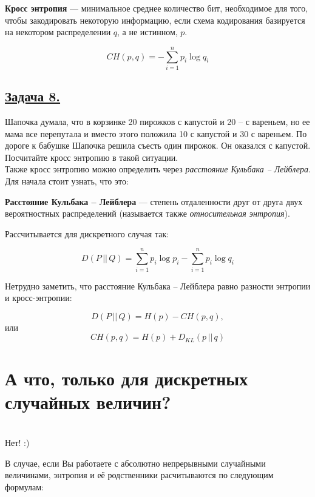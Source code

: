 \begin{siderules}
    \textbf{Кросс энтропия} --- минимальное среднее количество бит, необходимое для того, чтобы закодировать некоторую информацию, если схема кодирования базируется на некотором распределении $q$, а не истинном, $p$.
\end{siderules}

\[CH(p, q)=-\sum\limits_{i=1}^{n}p_i\log q_i \]

\subsection*{\hyperref[sec:sol_problem8]{Задача 8.}}\label{sec:problem8} Шапочка думала, что в корзинке 20 пирожков с капустой и 20 – с вареньем, но ее мама все перепутала и вместо этого положила 10 с капустой и 30 с вареньем. По дороге к бабушке Шапочка решила съесть один пирожок. Он оказался с капустой. Посчитайте кросс энтропию в такой ситуации.\\


Также кросс энтропию можно определить через \textit{расстояние Кульбака -- Лейблера}. Для начала стоит узнать, что это:

\begin{siderules}
    \textbf{Расстояние Кульбака -- Лейблера} --- степень отдаленности друг от друга двух вероятностных распределений (называется также \textit{относительная энтропия}). \end{siderules}
    
    Рассчитывается для дискретного случая так:

    \[D(P\, ||\, Q)=\sum\limits_{i=1}^n p_i\log p_i-\sum\limits_{i=1}^n p_i\log q_i\]

Нетрудно заметить, что расстояние Кульбака -- Лейблера равно разности энтропии и кросс-энтропии:

\[D(P\, ||\, Q)=H(p)-CH(p,q),\]
или
\[CH(p, q)=H(p)+D_{KL}(p\, || \, q)\]

\section*{А что, только для дискретных случайных величин?}~\
\\

Нет! :)

В случае, если Вы работаете с абсолютно непрерывными случайными величинами, энтропия и её родственники расчитываются по следующим формулам:

